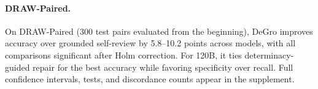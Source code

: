 \documentclass[sigconf,anonymous]{aamas}
\begin{document}

\paragraph{DRAW-Paired.}
On DRAW-Paired (300 test pairs evaluated from the beginning), DeGro improves accuracy over grounded self-review by 5.8--10.2 points across models, with all comparisons significant after Holm correction. For 120B, it ties determinacy-guided repair for the best accuracy while favoring specificity over recall. Full confidence intervals, tests, and discordance counts appear in the supplement.
\end{document}
